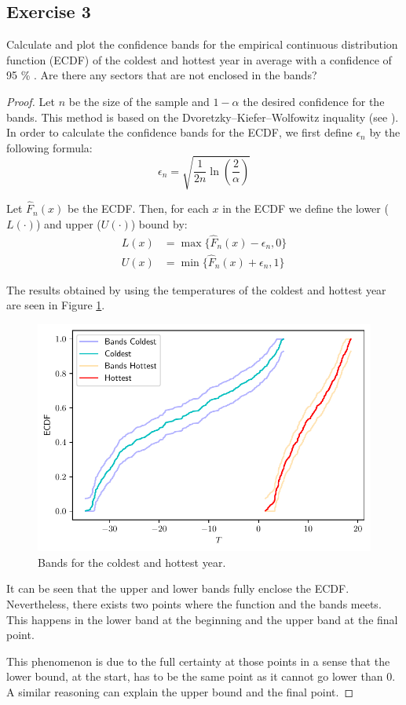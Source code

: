 \documentclass[11pt]{article}
\theoremstyle{definition}
\theoremstyle{remark}
\theoremstyle{remark}
\begin{document}
\subsection*{Exercise 3}
Calculate and plot the confidence bands for the empirical continuous
distribution function (ECDF) of the coldest and hottest year in
average with a confidence of 95 \% . Are there any sectors that are
not enclosed in the bands?

\begin{proof}
  Let $n$ be the size of the sample and $1 - \alpha$ the desired
  confidence for the bands. This method is based on the
  Dvoretzky–Kiefer–Wolfowitz inquality (see \cite{wasserman2006}).
  In order to calculate the confidence bands for the
  ECDF, we first define $\epsilon_n$ by the following formula:
  \begin{equation*}
    \epsilon_n = \sqrt{\frac{1}{2n} \ln\left(\frac{2}{\alpha}\right)}
  \end{equation*}

  Let $\hat{F}_n(x)$ be the ECDF. Then, for each $x$ in the ECDF we
  define the lower ($L(\cdot)$) and upper ($U(\cdot)$) bound by:
  \begin{align*}
    L(x) &= \max\{\hat{F}_n(x) - \epsilon_n, 0\} \\
    U(x) &= \min\{\hat{F}_n(x) + \epsilon_n, 1\}
  \end{align*}

  The results obtained by using the temperatures of the coldest and
  hottest year are seen in Figure \ref{fig:ex3}.
  \begin{figure}[H]
    \centering
    \includegraphics[scale=0.5]{../figs/ecdf_bands.pdf}
    \caption{Bands for the coldest and hottest year.}
    \label{fig:ex3}
  \end{figure}

  It can be seen that the upper and lower bands fully enclose the
  ECDF. Nevertheless, there exists two points where the function and
  the bands meets. This happens in the lower band at the beginning and
  the upper band at the final point.

  This phenomenon is due to the full certainty at those points in a
  sense that the lower bound, at the start, has to be the same point
  as it cannot go lower than 0. A similar reasoning can explain the
  upper bound and the final point.
\end{proof}
\end{document}
